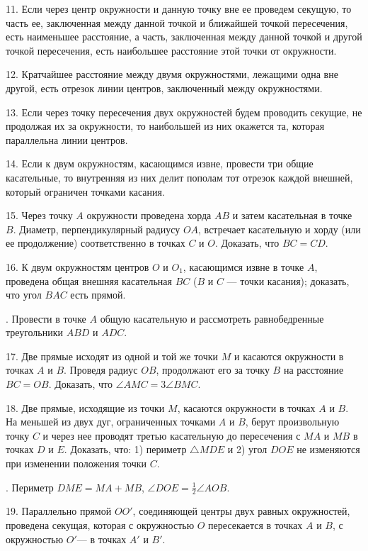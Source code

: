 \documentclass[oneside]{book}
\begin{document}
11.
Если через центр окружности и данную точку вне ее проведем секущую, то часть ее, заключенная между данной точкой и ближайшей точкой пересечения, есть наименьшее расстояние, а часть, заключенная между данной точкой и другой точкой пересечения, есть наибольшее расстояние этой точки от окружности.

12.
Кратчайшее расстояние между двумя окружностями, лежащими одна вне другой, есть отрезок линии центров, заключенный между окружностями.

13.
Если через точку пересечения двух окружностей будем проводить секущие, не продолжая их за окружности, то наибольшей из них окажется та, которая параллельна линии центров.

14.
Если к двум окружностям, касающимся извне, провести три общие касательные, то внутренняя из них делит пополам тот отрезок каждой внешней, который ограничен точками касания.

15.
Через точку $A$ окружности проведена хорда $AB$ и затем касательная в точке $B$.
Диаметр, перпендикулярный радиусу $OA$, встречает касательную и хорду (или ее продолжение) соответственно в точках $C$ и $O$.
Доказать, что $BC=CD$.

16.
К двум окружностям центров $O$ и $O_1$, касающимся извне в точке $A$, проведена общая внешняя касательная $BC$ ($B$ и $C$ — точки касания);
доказать, что угол $BAC$ есть прямой.

.
Провести в точке $A$ общую касательную и рассмотреть равнобедренные треугольники $ABD$ и $ADC$.

17.
Две прямые исходят из одной и той же точки $M$ и касаются окружности в точках $A$ и $B$.
Проведя радиус $OB$, продолжают его за точку $B$ на расстояние $BC=OB$.
Доказать, что $\angle AMC=3\angle BMC$.

18.
Две прямые, исходящие из точки $M$, касаются окружности в точках $A$ и $B$.
На меньшей из двух дуг, ограниченных точками $A$ и $B$, берут произвольную точку $C$ и через нее проводят третью касательную до пересечения с $MA$ и $MB$ в точках $D$ и $E$.
Доказать, что:
1) периметр $\triangle MDE$ и 2) угол $DOE$ не изменяются при изменении положения точки $C$.

.
Периметр $DME=MA+MB$, $\angle DOE=\tfrac12 \angle AOB$.

19.
Параллельно прямой $OO'$, соединяющей центры двух равных окружностей, проведена секущая, которая с окружностью $O$ пересекается в точках $A$ и $B$, с окружностью $O'$— в точках $A'$ и $B'$.
\end{document}
